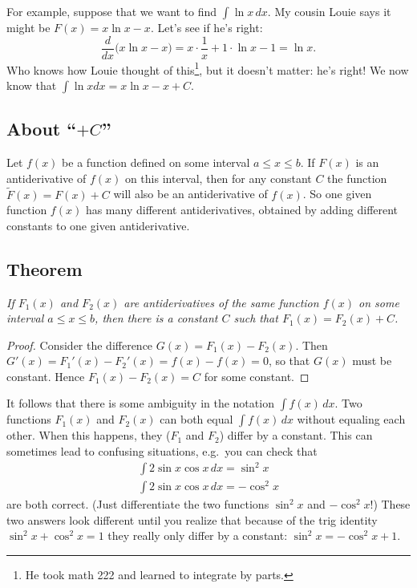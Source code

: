 For example, suppose that we want to find $\int \ln x\, d x$. My
cousin Louie says it might be $F(x) = x\ln x -x$.  Let's see if he's
right:
\[
\frac{d}{dx}\bigl(x\ln x-x\bigr) = x\cdot\frac1x+1\cdot\ln x-1 = \ln
x.
\]
Who knows how Louie thought of this\footnote{He took math 222 and
  learned to integrate by parts.}, but it doesn't matter: he's right!
We now know that $\int \ln x d x=x\ln x-x+C$.

\subsection{About ``$+C$''}
\label{sec:about-+c}
Let $f (x)$ be a function defined on some interval $a\leq x\leq b$.
If $F(x)$ is an antiderivative of $f(x)$ on this interval, then for
any constant $C$ the function $\tilde F(x)=F(x)+C$ will also be an
antiderivative of $f(x)$. So one given function $f(x)$ has many
different antiderivatives, obtained by adding different constants to
one given antiderivative.

\subsection*{Theorem}
\itshape
If $F_1 (x)$ and $F_2 (x)$ are antiderivatives of the same function
$f(x)$ on some interval $a\leq x\leq b$, then there is a constant $C$
such that $F_1 (x)=F_2 (x)+C$.\upshape

\begin{proof}
  Consider the difference $G(x)=F_1(x)-F_2(x)$. Then $G'(x) =
  F_1'(x)-F_2'(x)=f(x)-f(x)=0$, so that $G(x)$ must be constant. Hence
  $F_1(x)-F_2(x)=C$ for some constant.
\end{proof}

It follows that there is some ambiguity in the notation $\int f(x)\, d
x$. Two functions $F_1(x)$ and $F_2(x)$ can both equal $\int f(x)\, d
x$ without equaling each other. When this happens, they ($F_1$ and
$F_2$) differ by a constant. This can sometimes lead to confusing
situations, e.g.\ you can check that
\begin{gather*}
  \int 2\sin x\cos x\, d x = \sin^2 x \\
  \int 2\sin x\cos x\, d x = -\cos^2 x
\end{gather*}
are both correct. (Just differentiate the two functions $\sin^2x$ and
$-\cos^2x$!) These two answers look different until you realize that
because of the trig identity $\sin^2 x+\cos^2x=1$ they really only
differ by a constant: $\sin^2x= -\cos^2x+1$.


